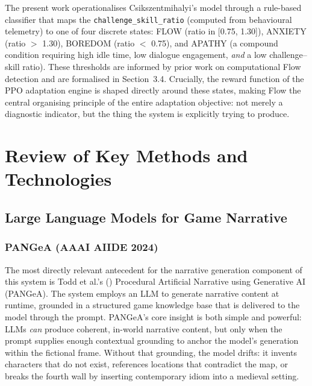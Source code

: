 The present work operationalises Csikszentmihalyi's model through a rule-based classifier that maps the \texttt{challenge\_skill\_ratio} (computed from behavioural telemetry) to one of four discrete states: FLOW (ratio in [0.75, 1.30]), ANXIETY (ratio $>$ 1.30), BOREDOM (ratio $<$ 0.75), and APATHY (a compound condition requiring high idle time, low dialogue engagement, \textit{and} a low challenge--skill ratio). These thresholds are informed by prior work on computational Flow detection \citep{yannakakis2009realtime} and are formalised in Section~3.4. Crucially, the reward function of the PPO adaptation engine is shaped directly around these states, making Flow the central organising principle of the entire adaptation objective: not merely a diagnostic indicator, but the thing the system is explicitly trying to produce.

\section{Review of Key Methods and Technologies}

\subsection{Large Language Models for Game Narrative}

\subsubsection{PANGeA (AAAI AIIDE 2024)}

The most directly relevant antecedent for the narrative generation component of this system is Todd et al.'s (\citeyear{todd2024pangea}) Procedural Artificial Narrative using Generative AI (PANGeA). The system employs an LLM to generate narrative content at runtime, grounded in a structured game knowledge base that is delivered to the model through the prompt. PANGeA's core insight is both simple and powerful: LLMs \textit{can} produce coherent, in-world narrative content, but only when the prompt supplies enough contextual grounding to anchor the model's generation within the fictional frame. Without that grounding, the model drifts: it invents characters that do not exist, references locations that contradict the map, or breaks the fourth wall by inserting contemporary idiom into a medieval setting.

